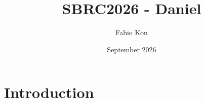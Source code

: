 \documentclass{article}
\title{SBRC2026 - Daniel}
\author{Fabio Kon}
\date{September 2026}
\begin{document}
\maketitle

\section{Introduction}
\end{document}
